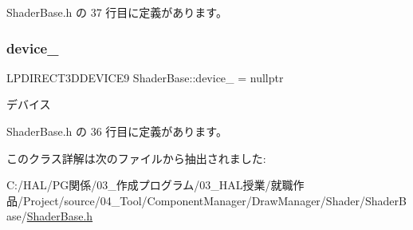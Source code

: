  Shader\+Base.\+h の 37 行目に定義があります。

\mbox{\label{class_shader_base_a15e4a4c1c1148433b9a0c60a7c32a366}} 
\subsubsection{\texorpdfstring{device\+\_\+}{device\_}}
{\footnotesize\ttfamily L\+P\+D\+I\+R\+E\+C\+T3\+D\+D\+E\+V\+I\+C\+E9 Shader\+Base\+::device\+\_\+ = nullptr\hspace{0.3cm}{\ttfamily [private]}}



デバイス 



 Shader\+Base.\+h の 36 行目に定義があります。



このクラス詳解は次のファイルから抽出されました\+:\begin{DoxyCompactItemize}
\item 
C\+:/\+H\+A\+L/\+P\+G関係/03\+\_\+作成プログラム/03\+\_\+\+H\+A\+L授業/就職作品/\+Project/source/04\+\_\+\+Tool/\+Component\+Manager/\+Draw\+Manager/\+Shader/\+Shader\+Base/\mbox{\hyperlink{_shader_base_8h}{Shader\+Base.\+h}}\end{DoxyCompactItemize}

